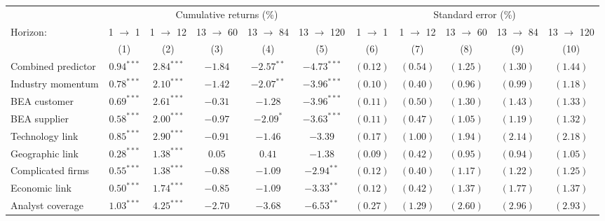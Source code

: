 \begin{tabular}{lcccccccccc}
   \toprule & \multicolumn{5}{c}{Cumulative returns (\%)} & \multicolumn{5}{c}{Standard error (\%)} \\
 \cmidrule(l){2-6} \cmidrule(l){7-11}Horizon: & 1 $\rightarrow$ 1 & 1 $\rightarrow$ 12 & 13 $\rightarrow$ 60 & 13 $\rightarrow$ 84 & 13 $\rightarrow$ 120 & 1 $\rightarrow$ 1 & 1 $\rightarrow$ 12 & 13 $\rightarrow$ 60 & 13 $\rightarrow$ 84 & 13 $\rightarrow$ 120 \\ 
   \cmidrule(l){2-6} \cmidrule(l){7-11} \vspace{5pt} & (1) & (2) & (3) & (4) & (5) & (6) & (7) & (8) & (9) & (10) \\ 
   \vspace{5pt}Combined predictor & $0.94^{***}$ & $2.84^{***}$ & $-1.84$ & $-2.57^{**}$ & $-4.73^{***}$ & $(0.12)$ & $(0.54)$ & $(1.25)$ & $(1.30)$ & $(1.44)$ \\ 
  Industry momentum & $0.78^{***}$ & $2.10^{***}$ & $-1.42$ & $-2.07^{**}$ & $-3.96^{***}$ & $(0.10)$ & $(0.40)$ & $(0.96)$ & $(0.99)$ & $(1.18)$ \\ 
  BEA customer & $0.69^{***}$ & $2.61^{***}$ & $-0.31$ & $-1.28$ & $-3.96^{***}$ & $(0.11)$ & $(0.50)$ & $(1.30)$ & $(1.43)$ & $(1.33)$ \\ 
  BEA supplier & $0.58^{***}$ & $2.00^{***}$ & $-0.97$ & $-2.09^{*}$ & $-3.63^{***}$ & $(0.11)$ & $(0.47)$ & $(1.05)$ & $(1.19)$ & $(1.32)$ \\ 
  Technology link & $0.85^{***}$ & $2.90^{***}$ & $-0.91$ & $-1.46$ & $-3.39$ & $(0.17)$ & $(1.00)$ & $(1.94)$ & $(2.14)$ & $(2.18)$ \\ 
  Geographic link & $0.28^{***}$ & $1.38^{***}$ & $0.05$ & $0.41$ & $-1.38$ & $(0.09)$ & $(0.42)$ & $(0.95)$ & $(0.94)$ & $(1.05)$ \\ 
  Complicated firms & $0.55^{***}$ & $1.38^{***}$ & $-0.88$ & $-1.09$ & $-2.94^{**}$ & $(0.12)$ & $(0.40)$ & $(1.17)$ & $(1.22)$ & $(1.25)$ \\ 
  Economic link & $0.50^{***}$ & $1.74^{***}$ & $-0.85$ & $-1.09$ & $-3.33^{**}$ & $(0.12)$ & $(0.42)$ & $(1.37)$ & $(1.77)$ & $(1.37)$ \\ 
  Analyst coverage & $1.03^{***}$ & $4.25^{***}$ & $-2.70$ & $-3.68$ & $-6.53^{**}$ & $(0.27)$ & $(1.29)$ & $(2.60)$ & $(2.96)$ & $(2.93)$ \\ 
   \bottomrule 
\end{tabular}
